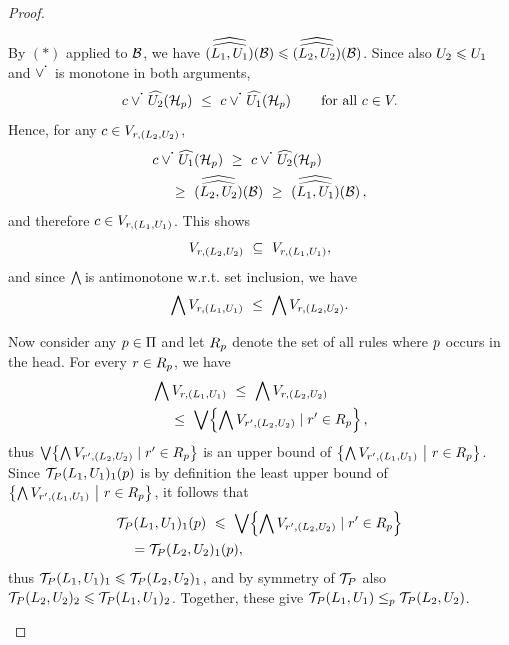 \begin{proposition}
\begin{proof}
\begin{description}
                  By $(\ast)$ applied to $\mathcal{B}$, we have $\widehat{\widehat{(L_1,U_1)}}\!\left(\mathcal{B}\right)\leqslant\widehat{\widehat{(L_2,U_2)}}\!\left(\mathcal{B}\right)$.
                  Since also $U_2\leqslant U_1$ and $\flpcontf{\flpor}$ is monotone in both arguments,
                  \[
                      c \flpcontf{\flpor}\fformeval{\uint_2}{\headminus}\ \leq\ c \flpcontf{\flpor} \fformeval{\uint_1}{\headminus} \qquad\text{for all } c\in\lset.
                  \]
                  Hence, for any $c\in V_{r,(L_2,U_2)}$,
                  \begin{align*}
&c \flpcontf{\flpor}\fformeval{\uint_1}{\headminus}\ \geq\ c \flpcontf{\flpor}\fformeval{\uint_2}{\headminus}\\
&\quad \ \geq\ \fnformeval{\lint_2}{\uint_2}{\body}\ \geq\ \fnformeval{\lint_1}{\uint_1}{\body},
\end{align*}
                  and therefore $c\in V_{r,(L_1,U_1)}$. This shows
                  \[
                      \lset_{r,(\lint_2,\uint_2)}\ \subseteq\ \lset_{r,(\lint_1,\uint_1)},
                  \]
                  and since $\bigwedge\!$ is antimonotone w.r.t. set inclusion, we have
                  \[
                      \bigglb\,\lset_{r,(\lint_1,\uint_1)} \ \leq\ \bigglb\,\lset_{r,(\lint_2,\uint_2)}.
                  \]

                  Now consider any $p\in\Pi$ and let $R_p$ denote the set of all rules where $p$ occurs in the head. For every $r\in R_p$, we have
                  \begin{align*}
&\bigglb\,\lset_{r,(\lint_1,\uint_1)} \ \leq\ \bigglb\,\lset_{r,(\lint_2,\uint_2)}\\
&\quad \ \leq\ \biglub\set{\bigglb\,\lset_{r',(\lint_2,\uint_2)}\mid r'\in R_\atom},
\end{align*}
                  thus $\bigvee\!\left\{\bigwedge\!\,V_{r',(L_2,U_2)}\mid r'\in R_p\right\}$ is an upper bound of $\left\{\bigwedge\!\,V_{r',(L_1,U_1)} \ \middle\vert\  r\in R_p\right\}$.
                  Since $\mathcal{T}_{P}(L_1,U_1)_1(p)$ is by definition the least upper bound of $\left\{\bigwedge\!\,V_{r',(L_1,U_1)} \ \middle\vert\  r\in R_p\right\}$, it follows that
                  \begin{align*}
&\fst{\lpap(\lint_1,\uint_1)}(\atom)\ \lleq\ \biglub\set{\bigglb\,\lset_{r',(\lint_2,\uint_2)}\mid r'\in R_\atom}\\
&\quad = \fst{\lpap(\lint_2,\uint_2)}(\atom),
\end{align*}
                  thus $\mathcal{T}_{P}(L_1,U_1)_1\leqslant\mathcal{T}_{P}(L_2,U_2)_1$, and by symmetry of $\mathcal{T}_{P}$  also $\mathcal{T}_{P}(L_2,U_2)_2\leqslant\mathcal{T}_{P}(L_1,U_1)_2$. Together, these give $\mathcal{T}_{P}(L_1,U_1)\leq_p\mathcal{T}_{P}(L_2,U_2)$.
        \end{description}
    \end{proof}
\end{proposition}


